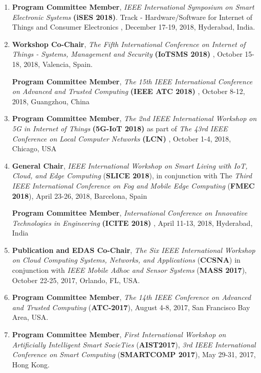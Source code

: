 
\begin{enumerate}


\item
\textbf{Program Committee Member}, \textit{IEEE International Symposium on Smart Electronic Systems} \textbf{(iSES 2018)}. Track - Hardware/Software for Internet of Things and Consumer Electronics , December 17-19, 2018, Hyderabad, India.

\item
\textbf{Workshop Co-Chair}, \textit{The Fifth International Conference on Internet of Things - Systems, Management and Security} \textbf{(IoTSMS 2018)} , October 15-18, 2018, Valencia, Spain.

\textbf{Program Committee Member}, \textit{The 15th IEEE International Conference on Advanced and Trusted Computing} \textbf{(IEEE ATC 2018)} , October 8-12, 2018, Guangzhou, China

\item
\textbf{Program Committee Member}, \textit{The 2nd IEEE International Workshop on 5G in Internet of Things} \textbf{(5G-IoT 2018)} as part of \textit{The 43rd IEEE Conference on Local Computer Networks} \textbf{(LCN)} , October 1-4, 2018, Chicago, USA

\item
\textbf{General Chair}, \textit{IEEE International Workshop on Smart Living with IoT, Cloud, and Edge Computing }(\textbf{SLICE 2018}), in conjunction with The \textit{Third IEEE International Conference on Fog and Mobile Edge Computing} (\textbf{FMEC 2018}), April 23-26, 2018, Barcelona, Spain

\textbf{Program Committee Member}, \textit{International Conference on Innovative Technologies in Engineering} \textbf{(ICITE 2018) }, April 11-13, 2018, Hyderabad, India

\item
\textbf{Publication and EDAS Co-Chair}, \textit{The Six IEEE International Workshop on Cloud Computing Systems, Networks, and Applications }(\textbf{CCSNA}) in conjunction with \textit{IEEE Mobile Adhoc and Sensor Systems} (\textbf{MASS 2017}), October 22-25, 2017, Orlando, FL, USA.

\item
\textbf{Program Committee Member}, \textit{The 14th IEEE Conference on Advanced and Trusted Computing} (\textbf{ATC-2017}), August 4-8, 2017, San Francisco Bay Area, USA.

\item
\textbf{Program Committee Member}, \textit{First International Workshop on Artificially Intelligent Smart SocieTies} (\textbf{AIST2017}), \textit{3rd IEEE International Conference on Smart Computing} (\textbf{SMARTCOMP 2017}), May 29-31, 2017, Hong Kong.


\end{enumerate}
